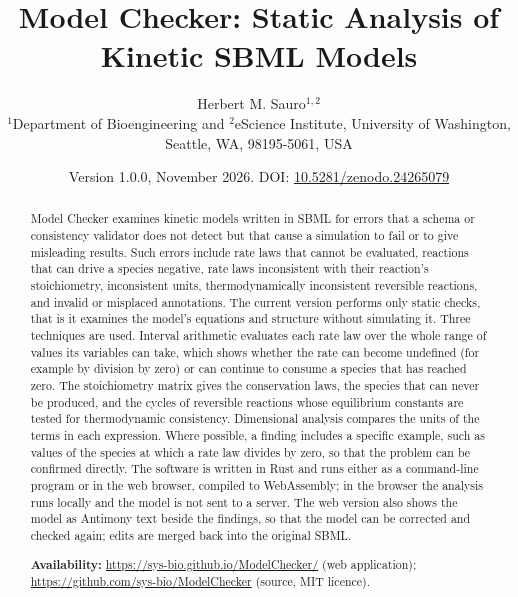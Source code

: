 \documentclass[10pt]{article}
\title{\vspace{-2.5em}Model Checker: Static Analysis of Kinetic SBML Models}
\author{Herbert M. Sauro$^{1,2}$\\[0.5ex]
  \small $^{1}$Department of Bioengineering and $^{2}$eScience Institute, University of Washington, Seattle, WA, 98195-5061, USA
}
\date{\vspace{-1ex}\small Version 1.0.0, November 2026. DOI: \href{https://doi.org/10.5281/zenodo.24265079}{10.5281/zenodo.24265079}}
\begin{document}
\maketitle
\vspace{-2em}

\begin{abstract}
\noindent
Model Checker examines kinetic models written in SBML for errors that a schema or consistency validator does
not detect but that cause a simulation to fail or to give misleading results. Such errors include rate laws that cannot be
evaluated, reactions that can drive a species negative, rate laws inconsistent with their reaction's
stoichiometry, inconsistent units, thermodynamically inconsistent reversible reactions, and invalid or
misplaced annotations. The current version performs only static checks, that is it examines the model's equations and structure without
simulating it. Three techniques are used. Interval arithmetic evaluates each rate law over the whole range of
values its variables can take, which shows whether the rate can become undefined (for example by division by
zero) or can continue to consume a species that has reached zero. The stoichiometry matrix gives the
conservation laws, the species that can never be produced, and the cycles of reversible reactions whose
equilibrium constants are tested for thermodynamic consistency. Dimensional analysis compares the units of the
terms in each expression. Where possible, a finding includes a specific example, such as values of the
species at which a rate law divides by zero, so that the problem can be confirmed directly. The software is written in Rust and runs either as a command-line program or
in the web browser, compiled to WebAssembly; in the browser the analysis runs locally and the model is not sent
to a server. The web version also shows the model as Antimony text beside the findings, so that the model can be
corrected and checked again; edits are merged back into the original SBML.

\noindent\textbf{Availability:} \url{https://sys-bio.github.io/ModelChecker/} (web application);\\
\url{https://github.com/sys-bio/ModelChecker} (source, MIT licence).
\end{abstract}
\end{document}
